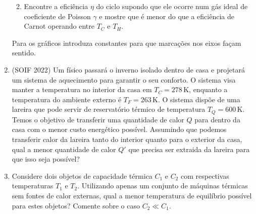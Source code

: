 \begin{enumerate}
\begin{enumerate}
{
                }
            \item
                Encontre a eficiência $\eta$ do ciclo supondo que ele ocorre num
                gás ideal de coeficiente de Poisson $\gamma$ e mostre que é
                menor do que a eficiência de Carnot operando entre $T_C$ e
                $T_H$.
        \end{enumerate}
        Para os gráficos introduza constantes para que marcações nos eixos façam
        sentido.

    \item
        (SOIF 2022) Um físico passará o inverno isolado dentro de casa e
        projetará um sistema de aquecimento para garantir o seu conforto. O
        sistema visa manter a temperatura no interior da casa em $T_C=278
        \,\mathrm K$, enquanto a temperatura do ambiente externo é $T_F=263
        \,\mathrm K$. O sistema dispõe de uma lareira que pode servir de
        reservatório térmico de temperatura $T_Q=600\,\mathrm K$. Temos o
        objetivo de transferir uma quantidade de calor $Q$ para dentro da casa
        com o menor custo energético possível. Assumindo que podemos transferir
        calor da lareira tanto do interior quanto para o exterior da casa, qual
        a menor quantidade de calor $Q'$ que precisa ser extraida da lareira
        para que isso seja possível?

    \item
        Considere dois objetos de capacidade térmica $C_1$ e $C_2$ com
        respectivas temperaturas $T_1$ e $T_2$. Utilizando apenas um conjunto de
        máquinas térmicas sem fontes de calor externas, qual a menor temperatura
        de equilíbrio possível para estes objetos? Comente sobre o caso $C_2\ll
        C_1$.


\end{enumerate}
